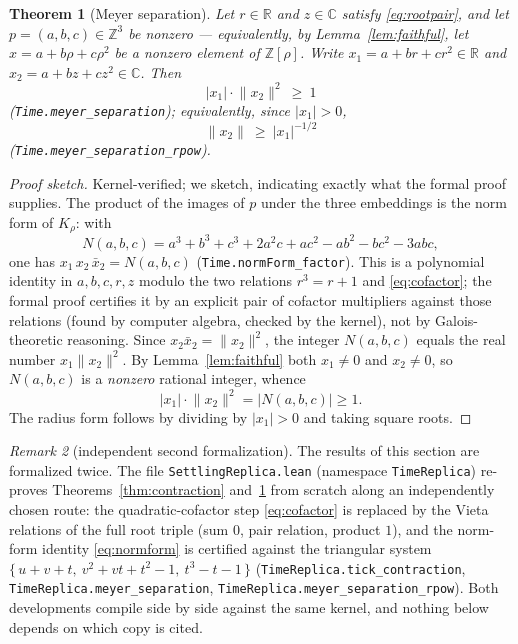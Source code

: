 \documentclass[11pt]{amsart}
\theoremstyle{plain}
\newtheorem{theorem}{Theorem}[section]
\theoremstyle{definition}
\theoremstyle{remark}
\newtheorem{remark}[theorem]{Remark}
\begin{document}
\begin{theorem}[Meyer separation]\label{thm:meyer}
Let $r \in \mathbb{R}$ and $z \in \mathbb{C}$ satisfy \eqref{eq:rootpair}, and let $p = (a,b,c) \in \mathbb{Z}^3$ be nonzero --- equivalently, by Lemma~\ref{lem:faithful}, let $x = a + b\rho + c\rho^2$ be a nonzero element of $\mathbb{Z}[\rho]$. Write $x_1 = a + br + cr^2 \in \mathbb{R}$ and $x_2 = a + bz + cz^2 \in \mathbb{C}$. Then
\[
  |x_1| \cdot \lVert x_2 \rVert^2 \ \ge\ 1
\]
\textup{(\texttt{Time.meyer\_separation})}; equivalently, since $|x_1| > 0$,
\[
  \lVert x_2 \rVert \ \ge\ |x_1|^{-1/2}
\]
\textup{(\texttt{Time.meyer\_separation\_rpow})}.
\end{theorem}

\begin{proof}[Proof sketch]
Kernel-verified; we sketch, indicating exactly what the formal proof supplies. The product of the images of $p$ under the three embeddings is the norm form of $K_{\rho}$: with
\begin{equation}\label{eq:normform}
  N(a,b,c) = a^3 + b^3 + c^3 + 2a^2c + ac^2 - ab^2 - bc^2 - 3abc ,
\end{equation}
one has $x_1 \, x_2 \, \bar x_2 = N(a,b,c)$ \textup{(\texttt{Time.normForm\_factor})}. This is a polynomial identity in $a, b, c, r, z$ modulo the two relations $r^3 = r + 1$ and \eqref{eq:cofactor}; the formal proof certifies it by an explicit pair of cofactor multipliers against those relations (found by computer algebra, checked by the kernel), not by Galois-theoretic reasoning. Since $x_2 \bar x_2 = \lVert x_2 \rVert^2$, the integer $N(a,b,c)$ equals the real number $x_1 \lVert x_2 \rVert^2$. By Lemma~\ref{lem:faithful} both $x_1 \ne 0$ and $x_2 \ne 0$, so $N(a,b,c)$ is a \emph{nonzero} rational integer, whence
\[
  |x_1| \cdot \lVert x_2 \rVert^2 = |N(a,b,c)| \ge 1 .
\]
The radius form follows by dividing by $|x_1| > 0$ and taking square roots.
\end{proof}

\begin{remark}[independent second formalization]\label{rem:replica}
The results of this section are formalized twice. The file \texttt{SettlingReplica.lean} (namespace \texttt{TimeReplica}) re-proves Theorems~\ref{thm:contraction} and~\ref{thm:meyer} from scratch along an independently chosen route: the quadratic-cofactor step \eqref{eq:cofactor} is replaced by the Vieta relations of the full root triple (sum $0$, pair relation, product $1$), and the norm-form identity \eqref{eq:normform} is certified against the triangular system $\{\,u + v + t,\ v^2 + vt + t^2 - 1,\ t^3 - t - 1\,\}$ \textup{(\texttt{TimeReplica.tick\_contraction}, \texttt{TimeReplica.meyer\_separation}, \texttt{TimeReplica.meyer\_separation\_rpow})}. Both developments compile side by side against the same kernel, and nothing below depends on which copy is cited.
\end{remark}
\end{document}
